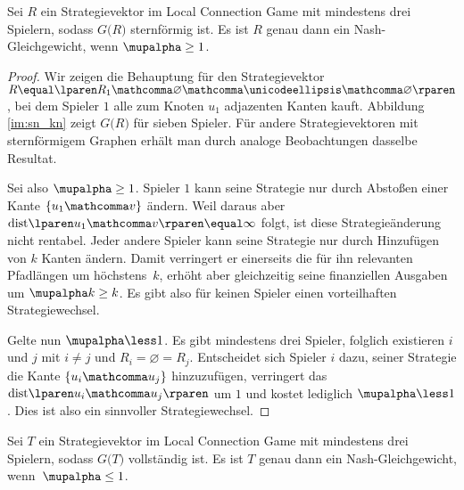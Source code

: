 \begin{lemma}
\label{la:local_stabil_stern}
  Sei $R$ ein Strategievektor
  im Local Connection Game mit mindestens drei Spielern,
  sodass $G \lparen R \rparen$ sternförmig ist.
  Es ist $R$ genau dann ein Nash-Gleichgewicht,
  wenn $\mupalpha \geq 1$.
\end{lemma}

\begin{proof}
  Wir zeigen die Behauptung für den Strategievektor
  $R \equal \lparen R_1 \mathcomma
  \varnothing \mathcomma \unicodeellipsis \mathcomma \varnothing \rparen$,
  bei dem Spieler $1$ alle zum Knoten $u_1$ adjazenten Kanten kauft.
  Abbildung \ref{im:sn_kn} zeigt $G \lparen R \rparen$ für sieben Spieler.
  Für andere Strategievektoren mit sternförmigem Graphen
  erhält man durch analoge Beobachtungen dasselbe Resultat.

  Sei also $\mupalpha \geq 1$.
  Spieler $1$ kann seine Strategie nur durch Abstoßen einer Kante
  $\lbrace u_1 \mathcomma v \rbrace$ ändern.
  Weil daraus aber $\dist{u_1}{v} \equal \infty$ folgt,
  ist diese Strategieänderung nicht rentabel.
  Jeder andere Spieler kann seine Strategie
  nur durch Hinzufügen von $k$ Kanten ändern.
  Damit verringert er einerseits die für ihn relevanten Pfadlängen
  um höchstens~$k$,
  erhöht aber gleichzeitig seine finanziellen Ausgaben
  um $\mupalpha k \geq k$.
  Es gibt also für keinen Spieler einen vorteilhaften Strategiewechsel.

  Gelte nun $\mupalpha \less 1$.
  Es gibt mindestens drei Spieler,
  folglich existieren $i$ und $j$ mit $i \ne j$
  und $R_i \equal \varnothing \equal R_j$.
  Entscheidet sich Spieler $i$ dazu,
  seiner Strategie die Kante $\lbrace u_i \mathcomma u_j \rbrace$ hinzuzufügen,
  verringert das $\dist{u_i}{u_j}$ um $1$
  und kostet lediglich $\mupalpha \less 1$.
  Dies ist also ein sinnvoller Strategiewechsel.
\end{proof}

\begin{lemma}
\label{la:local_stabil_vollständig}
  Sei $T$ ein Strategievektor
  im Local Connection Game mit mindestens drei Spielern,
  sodass $G \lparen T \rparen$ vollständig ist.
  Es ist $T$ genau dann ein Nash-Gleichgewicht,
  wenn~$\mupalpha \leq 1$.
\end{lemma}

